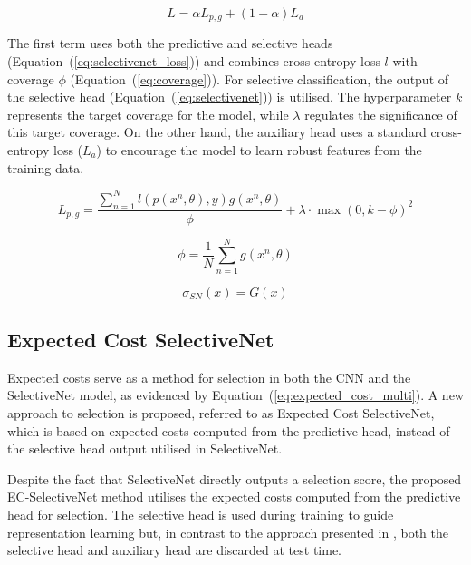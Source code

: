 \begin{equation}
	L = \alpha L_{p, g} + (1 - \alpha)L_a
	\label{eq:selective_loss}
\end{equation}

The first term uses both the predictive and selective heads (Equation~(\ref{eq:selectivenet_loss})) and combines cross-entropy loss $l$ with coverage $\phi$ (Equation~(\ref{eq:coverage})). For selective classification, the output of the selective head (Equation~(\ref{eq:selectivenet})) is utilised. The hyperparameter $k$ represents the target coverage for the model, while $\lambda$ regulates the significance of this target coverage. On the other hand, the auxiliary head uses a standard cross-entropy loss ($L_a$) to encourage the model to learn robust features from the training data.

\begin{equation}
	L_{p,g}=\frac{\sum^N_{n=1}l(p(x^n,\theta),y)g(x^n,\theta)}{\phi}+\lambda\cdot\max(0,k-\phi)^2
	\label{eq:selectivenet_loss}
\end{equation}

\begin{equation}
	\phi = \frac{1}{N}\sum^N_{n=1}g(x^n,\theta)
	\label{eq:coverage}
\end{equation}

\noindent 

\begin{equation}
	\sigma_{SN}(x) = G(x)
	\label{eq:selectivenet}
\end{equation}

\subsection{Expected Cost SelectiveNet}
\label{subsec:ec_selectivenet}
Expected costs serve as a method for selection in both the CNN and the SelectiveNet model, as evidenced by Equation~(\ref{eq:expected_cost_multi}). A new approach to selection is proposed, referred to as Expected Cost SelectiveNet, which is based on expected costs computed from the predictive head, instead of the selective head output utilised in SelectiveNet.

Despite the fact that SelectiveNet directly outputs a selection score, the proposed EC-SelectiveNet method utilises the expected costs computed from the predictive head for selection. The selective head is used during training to guide representation learning but, in contrast to the approach presented in \cite{geifman2019selectivenet}, both the selective head and auxiliary head are discarded at test time.



